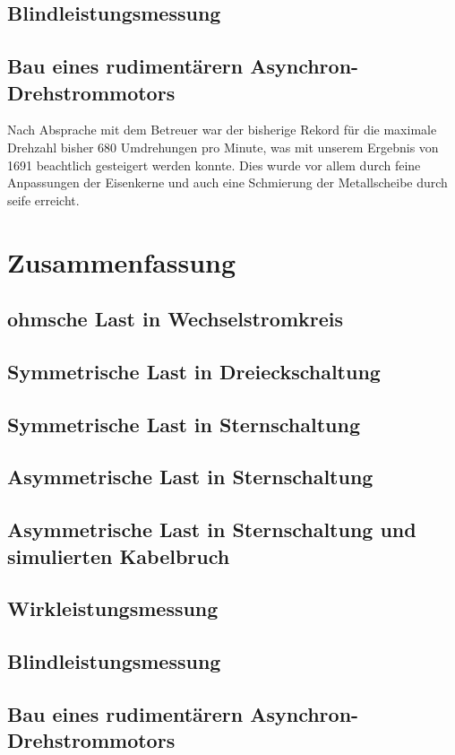 \documentclass[12pt,english,ngerman]{scrartcl}
\begin{document}
\subsection{Blindleistungsmessung}


\subsection{Bau eines rudimentärern Asynchron-Drehstrommotors}

Nach Absprache mit dem Betreuer war der bisherige Rekord für die maximale Drehzahl bisher 680 Umdrehungen pro Minute,
was mit unserem Ergebnis von 1691 beachtlich gesteigert werden konnte. Dies wurde vor allem durch feine Anpassungen der 
Eisenkerne und auch eine Schmierung der Metallscheibe durch seife erreicht.

\section{Zusammenfassung}
\label{sec:zusammenfassung}

\subsection{ohmsche Last in Wechselstromkreis}


\subsection{Symmetrische Last in Dreieckschaltung}


\subsection{Symmetrische Last in Sternschaltung}


\subsection{Asymmetrische Last in Sternschaltung}


\subsection{Asymmetrische Last in Sternschaltung und simulierten Kabelbruch}


\subsection{Wirkleistungsmessung}


\subsection{Blindleistungsmessung}


\subsection{Bau eines rudimentärern Asynchron-Drehstrommotors}

\newpage

\printbibliography
\listoffigures
\listoftables
\end{document}
